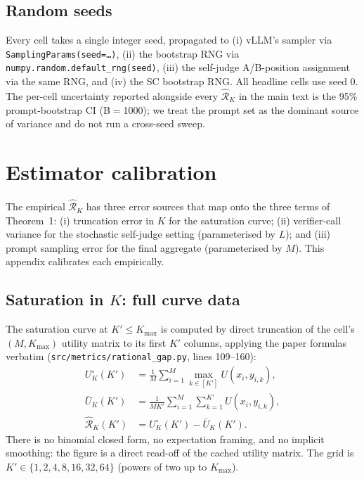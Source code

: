 \subsection{Random seeds}
\label{app:config:seeds}

Every cell takes a single integer seed, propagated to (i) vLLM's
sampler via \texttt{SamplingParams(seed=\ldots)}, (ii) the bootstrap
RNG via \texttt{numpy.random.default\_rng(seed)}, (iii) the self-judge
A/B-position assignment via the same RNG, and (iv) the SC bootstrap
RNG\@. All headline cells use seed $0$. The per-cell uncertainty
reported alongside every $\hat{\mathcal R}_K$ in the main text is the 95\%
prompt-bootstrap CI (B$=$1000); we treat the prompt set as the
dominant source of variance and do not run a cross-seed sweep.

\section{Estimator calibration}
\label{app:calibration}

The empirical $\hat{\mathcal R}_K$ has three error sources that map onto the three
terms of Theorem~1: (i) truncation error in $K$ for the saturation
curve; (ii) verifier-call variance for the stochastic self-judge
setting (parameterised by $L$); and (iii) prompt sampling error for the
final aggregate (parameterised by $M$). This appendix calibrates each
empirically.

\subsection{Saturation in \texorpdfstring{$K$}{K}: full curve data}
\label{app:calibration:K}

The saturation curve at $K'\leq K_{\max}$ is computed by direct
truncation of the cell's $(M, K_{\max})$ utility matrix to its first
$K'$ columns, applying the paper formulas verbatim
(\texttt{src/metrics/rational\_gap.py}, lines 109--160):
\begin{align}
U^\circ_K(K') &= \tfrac{1}{M}\sum_{i=1}^{M} \max_{k\in[K']} U(x_i, y_{i,k}), \\
\bar U_K(K')  &= \tfrac{1}{MK'} \sum_{i=1}^{M} \sum_{k=1}^{K'} U(x_i, y_{i,k}), \\
\hat{\mathcal R}_K(K')  &= U^\circ_K(K') - \bar U_K(K').
\end{align}
There is no binomial closed form, no expectation framing, and no
implicit smoothing: the figure is a direct read-off of the cached
utility matrix. The grid is
$K' \in \{1, 2, 4, 8, 16, 32, 64\}$ (powers of two up to $K_{\max}$).

